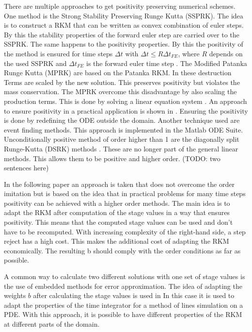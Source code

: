 \documentclass[a4paper]{scrartcl}
\numberwithin{equation}{section}
\theoremstyle{plain}
\theoremstyle{definition}
\numberwithin{theorem}{section}
\newcommand{\dt}{{\Delta t}}
\newcommand{\1}{\mathbbm{1}}
\begin{document}
There are multiple approaches to get positivity preserving numerical schemes.
One method is the Strong Stability Preserving Runge Kutta (SSPRK). 
The idea is to construct a RKM that can be written as convex combination of euler steps. 
By this the stability properties of the forward euler step are carried over to the SSPRK.
The same happens to the positivity properties. By this the positivity of the method is ensured for time steps $\dt$ with $\dt \leq R \dt_{FE}$, where $R$ depends on the used SSPRK and $\dt_{FE}$ is the forward euler time step \cite{gottlieb_strong_2011}. 
The Modified Patanka Runge Kutta (MPRK) are 
based on the Patanka RKM. In these destruction Terms are scaled by the new solution. This preserves positivity but violates the mass conservation. The MPRK overcome this disadvantage by also scaling the production terms. This is done by solving a linear equation system \cite{kopecz_comparison_2019}.
An approach to ensure positivity in a practical application is shown in \cite{shampine_non-negative_2005}. Ensuring the positivity is done by redefining the ODE outside the domain. Another technique used are event finding methods. This approach is implemented in the Matlab ODE Suite.
Unconditionally positive method of order higher than 1 are the diagonally split Runge-Kutta (DSRK) methods \cite{horvath_positivity_1998}. These are no longer part of the general linear methods. This allows them to be positive and higher order. (TODO: two sentences here)

In the following paper an approach is taken that does not overcome the order imitation but is based on the idea that in practical problems for many time steps positivity can be achieved with a higher order methods.
The main idea is to adapt the RKM after computation of the stage values in a way that ensures positivity.  
This means that the computed stage values can be used and don't have to be recomputed. With increasing complexity of the right-hand side, a step reject has a high cost. This makes the additional cost of adapting the RKM economically.
The resulting b should comply with the order conditions as far as possible.

A common way to calculate two different solutions with one set of stage values is the use of embedded methods for error approximation. 
The idea of adapting the weights $b$ after calculating the stage values is used in \cite{ketcheson_spatially_2013}
In this case it is used to adapt the properties of the time integrator for a method of lines simulation on a PDE. With this approach, it is possible to have different properties of the RKM at different parts of the domain. 
\end{document}
